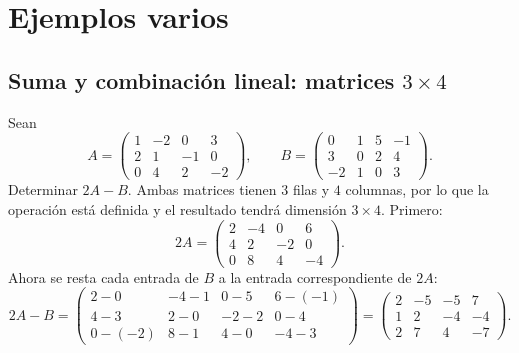 \documentclass[12pt]{article}
\theoremstyle{remark}
\begin{document}
\section{Ejemplos varios}

\subsection*{Suma y combinación lineal: matrices $3\times4$}
Sean
\[
A=\begin{pmatrix}1&-2&0&3\\2&1&-1&0\\0&4&2&-2\end{pmatrix},\qquad
B=\begin{pmatrix}0&1&5&-1\\3&0&2&4\\-2&1&0&3\end{pmatrix}.
\]
Determinar $2A-B$.
Ambas matrices tienen $3$ filas y $4$ columnas, por lo que la operación está definida y el resultado tendrá dimensión $3\times4$. Primero:
\[
2A=\begin{pmatrix}2&-4&0&6\\4&2&-2&0\\0&8&4&-4\end{pmatrix}.
\]
Ahora se resta cada entrada de $B$ a la entrada correspondiente de $2A$:
\[
2A-B=\begin{pmatrix}
2-0&-4-1&0-5&6-(-1)\\
4-3&2-0&-2-2&0-4\\
0-(-2)&8-1&4-0&-4-3
\end{pmatrix}
=\boxed{\begin{pmatrix}2&-5&-5&7\\1&2&-4&-4\\2&7&4&-7\end{pmatrix}}.
\]
\end{document}
